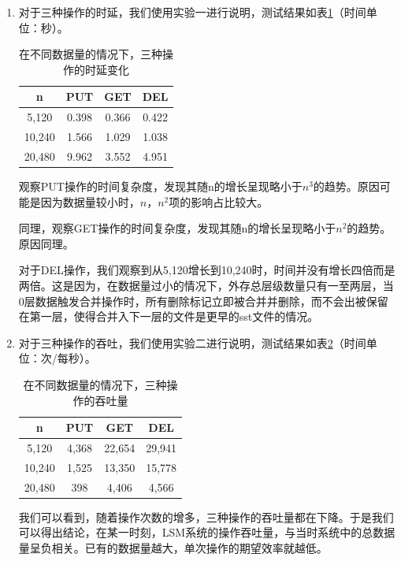 \documentclass{article}
\begin{document}
\begin{enumerate}
    \item %
    对于三种操作的时延，我们使用实验一进行说明，测试结果如表\ref{tab:1}（时间单位：秒）。
    
   	\begin{table}[ht]
    	\caption{在不同数据量的情况下，三种操作的时延变化}
    	\label{tab:1}
   		\begin{center}
	    	\begin{tabular}{c | c | c | c}
		    	\hline
		    	n & PUT & GET & DEL \\
		    	\hline\hline
		    	5,120 & 0.398 & 0.366 & 0.422 \\
		    	10,240 & 1.566 & 1.029 & 1.038 \\
		    	20,480 & 9.962 & 3.552 & 4.951 \\
		    	\hline
		    \end{tabular}
	    \end{center}
   	\end{table}
	
	观察PUT操作的时间复杂度，发现其随n的增长呈现略小于$n^3$的趋势。原因可能是因为数据量较小时，$n$，$n^2$项的影响占比较大。
	
	同理，观察GET操作的时间复杂度，发现其随n的增长呈现略小于$n^2$的趋势。原因同理。
	
	对于DEL操作，我们观察到从5,120增长到10,240时，时间并没有增长四倍而是两倍。这是因为，在数据量过小的情况下，外存总层级数量只有一至两层，当0层数据触发合并操作时，所有删除标记立即被合并并删除，而不会出被保留在第一层，使得合并入下一层的文件是更早的sst文件的情况。
	
    \item %
    
    对于三种操作的吞吐，我们使用实验二进行说明，测试结果如表\ref{tab:2}（时间单位：次/每秒）。
    
    \begin{table}[ht]
	    \caption{在不同数据量的情况下，三种操作的吞吐量}
	    \label{tab:2}
	    \begin{center}
	    	\begin{tabular}{c | c | c | c}
	    		\hline
	    		n & PUT & GET & DEL \\
	    		\hline\hline
	    		5,120 & 4,368 & 22,654 & 29,941 \\
	    		10,240 & 1,525 & 13,350 & 15,778 \\
	    		20,480 & 398 & 4,406 & 4,566 \\
	    		\hline
	    	\end{tabular}
	    \end{center}
    \end{table}

	我们可以看到，随着操作次数的增多，三种操作的吞吐量都在下降。于是我们可以得出结论，在某一时刻，LSM系统的操作吞吐量，与当时系统中的总数据量呈负相关。已有的数据量越大，单次操作的期望效率就越低。

\end{enumerate}
\end{document}
